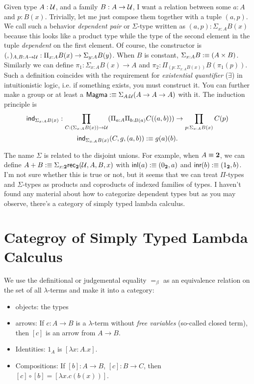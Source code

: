 Given type $A:\mathcal{U}$, and a family $B:A\to\mathcal{U}$, I want a relation
between some $a: A$ and $p: B(x)$. Trivially, let me just compose them
together with a tuple $(a, p)$. We call such a behavior {\it dependent 
pair} or $\Sigma$-type written as $(a,p):\Sigma_{x:A}B(x)$ because this 
looks like a product type while the type of the second element in the
tuple {\it dependent} on the first element. Of course, the constructor
is $(,)_{A,B:A\to\mathcal{U}}: \Pi_{x:A}B(x)\to\Sigma_{y:A}B(y)$.
When $B$ is constant, $\Sigma_{x:A}B:\equiv(A\times B)$. Similarly we can
define $\pi_1:\Sigma_{x:A}B(x)\to A$ and 
$\pi_2:\Pi_{(p: \Sigma_{x:A}B(x))}B(\pi_1(p))$. Such a definition coincides
with the requirement for {\it existential quantifier} ($\exists$) in
intuitionistic logic, i.e. if something exists, you must construct it.
You can further make a group or at least a 
$\text{\sf Magma}:\equiv \Sigma_{A:\mathcal{U}}(A\to A\to A)$ with it.
The induction principle is
$$
    \text{\sf ind}_{\Sigma_{x:A}B(x)}:\prod_{C:(\Sigma_{x:A}B(x))\to\mathcal{U}}
    (\Pi_{a:A}\Pi_{b:B(a)}C((a, b)))\to
    \prod_{p: \Sigma_{x:A}B(x)} C(p)
$$
$$
    \text{\sf ind}_{\Sigma_{x:A}B(x)}(C,g,(a,b)) :\equiv g(a)(b).
$$

The name $\Sigma$ is related to the disjoint unions. For example,
when $A\equiv \mathbf{2}$, we can define 
$A+B:\equiv \Sigma_{x:\mathbf{2}}\text{\sf rec}_{\mathbf{2}}(\mathcal{U},A,B,x)$ with 
$\text{\sf inl}(a):\equiv(0_{\mathbf{2}},a)$ and $\text{\sf inr}(b):\equiv(1_{\mathbf{2}},b)$. I'm not sure
whether this is true or not, but it seems that we can treat $\Pi$-types
and $\Sigma$-types as products and coproducts of indexed families of 
types. I haven't found any material about how to categorize dependent
types but as you may observe, there's a category of simply typed lambda
calculus. 

\section{Categroy of Simply Typed Lambda Calculus}
We use the definitional or judgemental equality $=_\beta$ as an
equivalence relation on the set of all $\lambda$-terms and make it
into a category:

\begin{itemize}[label={}]
    \item objects: the types
    \item arrows: If $c: A\to B$ is a $\lambda$-term without {\it free
    variables} (so-called closed term), then $[c]$ is an arrow from
    $A\to B$.
    \item Identities: $1_A$ is $[\lambda x: A.x]$.
    \item Compositions: If $[b]: A \to B$, $[c]: B\to C$, then
    $[c]\circ [b] = [\lambda x. c(b(x))]$.
\end{itemize}

